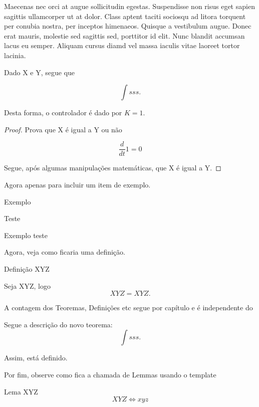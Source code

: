 Maecenas nec orci at augue sollicitudin egestas. Suspendisse non risus
eget sapien sagittis ullamcorper ut at dolor. Class aptent taciti
sociosqu ad litora torquent per conubia nostra, per inceptos himenaeos.
Quisque a vestibulum augue. Donec erat mauris, molestie sed sagittis
sed, porttitor id elit. Nunc blandit accumsan lacus eu semper. Aliquam
cursus diamd vel massa iaculis vitae laoreet tortor lacinia.
\begin{thm}
Dado X e Y, segue que 

\[
\int sss.
\]

Desta forma, o controlador é dado por $K=1$.
\end{thm}
\begin{proof}
Prova que X é igual a Y ou não

\[
\frac{d}{dt}1=0
\]

Segue, após algumas manipulações matemáticas, que X é igual a Y.
\end{proof}
Agora apenas para incluir um item de exemplo.
\begin{example}
Exemplo

Teste

Exemplo teste
\end{example}
Agora, veja como ficaria uma definição.
\begin{defn}
Definição XYZ

Seja XYZ, logo
\[
XYZ=XYZ.
\]
\end{defn}
A contagem dos Teoremas, Definições etc segue por capítulo e é independente
do 
\begin{thm}
Segue a descrição do novo teorema: 
\[
\int sss.
\]

Assim, está definido.

Por fim, observe como fica a chamada de Lemmas usando o template
\end{thm}
\begin{lem}[TESTE]
 Lema XYZ
\[
XYZ\iff xyz
\]
\end{lem}

